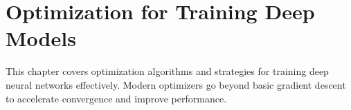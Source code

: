 
\chapter{Optimization for Training Deep Models}
\label{chap:optimization}

This chapter covers optimization algorithms and strategies for training deep neural networks effectively. Modern optimizers go beyond basic gradient descent to accelerate convergence and improve performance.







